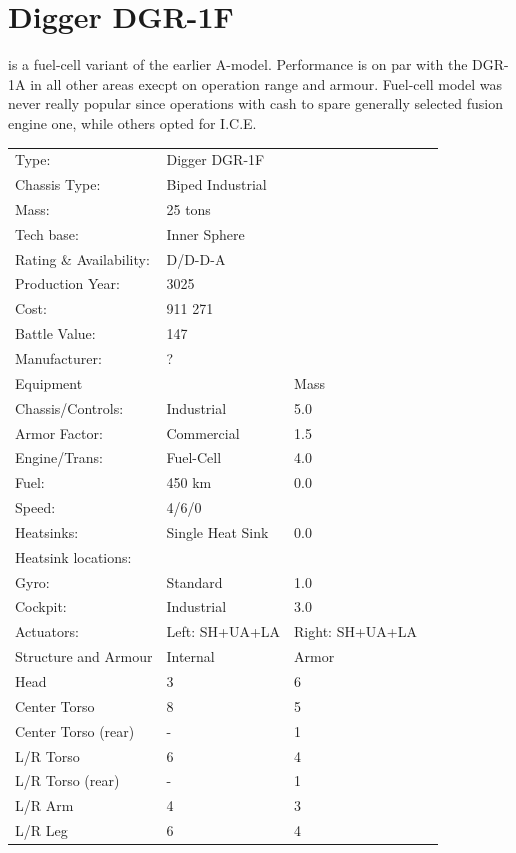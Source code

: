 \documentclass{tufte-book}
\begin{document}
\section{Digger DGR-1F}
 is a fuel-cell variant of the earlier A-model.
Performance is on par with the DGR-1A in all other areas
execpt on operation range and armour. Fuel-cell model was never really
popular since operations with cash to spare generally selected fusion
engine one, while others opted for I.C.E.


\bigskip
\begin{table}
\begin{minipage}{\textwidth}
\begin{center}
\begin{tabular}{llll}
\toprule
Type: & Digger DGR-1F & \\
Chassis Type: & Biped Industrial & \\
Mass: & 25 tons & \\
Tech base: & Inner Sphere & \\
Rating \& Availability: & D/D-D-A & \\
Production Year: & 3025 & \\
Cost: & 911 271 & \\
Battle Value: & 147 & \\
Manufacturer: & ? & \\
Equipment & & Mass \\
\quad Chassis/Controls: & Industrial & 5.0 \\
\quad Armor Factor: & Commercial & 1.5 \\
\quad Engine/Trans: & Fuel-Cell & 4.0 \\
\quad Fuel: & 450 km & 0.0 \\
\quad Speed: & \multicolumn{2}{l}{4/6/0} \\
\quad Heatsinks: & Single Heat Sink & 0.0 \\
\quad Heatsink locations: &  & \\
\quad Gyro: & Standard & 1.0 \\
\quad Cockpit: & Industrial & 3.0 \\
\quad Actuators: & Left: SH+UA+LA & Right: SH+UA+LA \\
Structure and Armour & Internal & Armor \\
\quad Head & 3 & 6 \\
\quad Center Torso & 8 & 5 \\
\quad Center Torso (rear) & - & 1 \\
\quad L/R Torso & 6 & 4 \\
\quad L/R Torso (rear) & - & 1 \\
\quad L/R Arm & 4 & 3 \\
\quad L/R Leg & 6 & 4 \\


\end{tabular}
\end{center}
\end{minipage}
\end{table}
\end{document}
